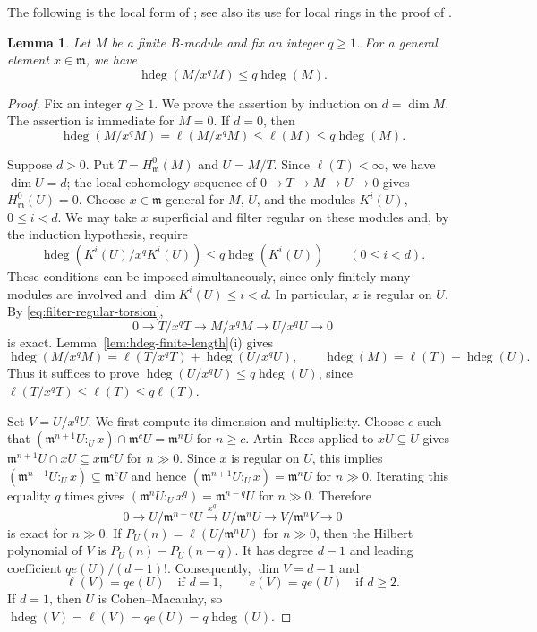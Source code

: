 \documentclass[11pt,reqno]{amsart}
\numberwithin{equation}{section}
\newtheorem{lemma}[theorem]{Lemma}
\theoremstyle{definition}
\newcommand{\m}{\mathfrak m}
\newcommand{\hdeg}{\operatorname{hdeg}}
\begin{document}
The following is the local form of
\cite[Corollary~2.16]{Vasconcelos1998}; see also its use for local
rings in the proof of \cite[Theorem~3.5]{Vasconcelos1998}.

\begin{lemma}
\label{lem:generic-power-hdeg}
Let $M$ be a finite $B$-module and fix an integer $q\ge1$.
For a general element $x\in\m$, we have
\begin{equation}
 \hdeg(M/x^qM)\leq q\hdeg(M).
 \label{eq:generic-power-hdeg}
\end{equation}
\end{lemma}

\begin{proof}
Fix an integer $q\ge1$. We prove the assertion by induction on
$d=\dim M$.
The assertion is immediate for $M=0$. If $d=0$, then
\[
 \hdeg(M/x^qM)=\ell(M/x^qM)\le\ell(M)\le q\hdeg(M).
\]

Suppose $d>0$. Put $T=H^0_{\m}(M)$ and $U=M/T$.
Since $\ell(T)<\infty$, we have $\dim U=d$; the local cohomology
sequence of $0\to T\to M\to U\to0$ gives $H^0_{\m}(U)=0$.
Choose $x\in\m$ general for $M$, $U$, and the modules $K^i(U)$,
$0\le i<d$. We may take $x$ superficial and filter regular on
these modules and, by the induction hypothesis, require
\[
 \hdeg(K^i(U)/x^qK^i(U))\le q\hdeg(K^i(U))
 \qquad(0\le i<d).
\]
These conditions can be imposed simultaneously, since only finitely many
modules are involved and $\dim K^i(U)\le i<d$. In particular, $x$ is regular
on $U$. By \eqref{eq:filter-regular-torsion},
\[
 0\longrightarrow T/x^qT\longrightarrow M/x^qM
 \longrightarrow U/x^qU\longrightarrow0
\]
is exact. Lemma~\ref{lem:hdeg-finite-length}\textup{(i)} gives
\[
 \hdeg(M/x^qM)=\ell(T/x^qT)+\hdeg(U/x^qU),
 \qquad \hdeg(M)=\ell(T)+\hdeg(U).
\]
Thus it suffices to prove $\hdeg(U/x^qU)\le q\hdeg(U)$,
since $\ell(T/x^qT)\le\ell(T)\le q\ell(T)$.

Set $V=U/x^qU$. We first compute its dimension and multiplicity.
Choose $c$ such that
$(\m^{n+1}U:_U x)\cap\m^cU=\m^nU$ for $n\ge c$.
Artin--Rees applied to $xU\subseteq U$ gives
$\m^{n+1}U\cap xU\subseteq x\m^cU$ for $n\gg0$.
Since $x$ is regular on $U$, this implies
$(\m^{n+1}U:_U x)\subseteq\m^cU$ and hence
$(\m^{n+1}U:_U x)=\m^nU$ for $n\gg0$.
Iterating this equality $q$ times gives
$(\m^nU:_U x^q)=\m^{n-q}U$ for $n\gg0$.
Therefore
\[
 0\longrightarrow U/\m^{n-q}U
 \xrightarrow{x^q}U/\m^nU
 \longrightarrow V/\m^nV\longrightarrow0
\]
is exact for $n\gg0$. If $P_U(n)=\ell(U/\m^nU)$ for $n\gg0$,
then the Hilbert polynomial of $V$ is $P_U(n)-P_U(n-q)$.
It has degree $d-1$ and leading coefficient $qe(U)/(d-1)!$.
Consequently, $\dim V=d-1$ and
\[
 \ell(V)=qe(U)\quad\text{if }d=1,
 \qquad e(V)=qe(U)\quad\text{if }d\ge2.
\]
If $d=1$, then $U$ is Cohen--Macaulay, so
$\hdeg(V)=\ell(V)=qe(U)=q\hdeg(U)$.


\end{proof}
\end{document}
